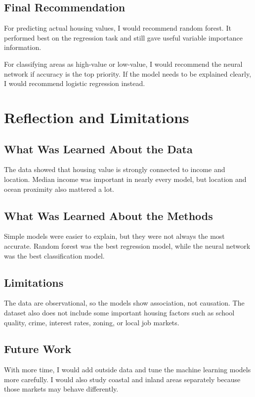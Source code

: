 \documentclass[12pt]{report}
\begin{document}
\section{Final Recommendation}

For predicting actual housing values, I would recommend random forest. It performed best on the regression task and still gave useful variable importance information.

For classifying areas as high-value or low-value, I would recommend the neural network if accuracy is the top priority. If the model needs to be explained clearly, I would recommend logistic regression instead.

\newpage

\chapter{Reflection and Limitations}

\section{What Was Learned About the Data}

The data showed that housing value is strongly connected to income and location. Median income was important in nearly every model, but location and ocean proximity also mattered a lot.

\section{What Was Learned About the Methods}

Simple models were easier to explain, but they were not always the most accurate. Random forest was the best regression model, while the neural network was the best classification model.

\section{Limitations}

The data are observational, so the models show association, not causation. The dataset also does not include some important housing factors such as school quality, crime, interest rates, zoning, or local job markets.

\section{Future Work}

With more time, I would add outside data and tune the machine learning models more carefully. I would also study coastal and inland areas separately because those markets may behave differently.
\end{document}
